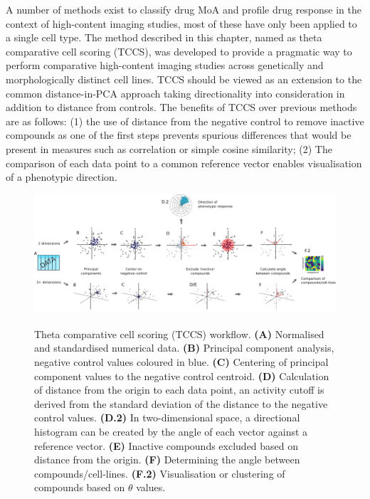 \documentclass[a4paper,11pt,twoside,openright]{scrbook}
\begin{document}
A number of methods exist to classify drug MoA and profile drug response in the context of high-content imaging 
studies, most of these have only been applied to a single cell type.
The method described in this chapter, named as theta comparative cell scoring (TCCS), was developed to provide a 
pragmatic way to perform comparative high-content imaging studies across genetically and morphologically distinct cell 
lines.
TCCS should be viewed as an extension to the common distance-in-PCA approach taking directionality into consideration 
in addition to distance from controls.
The benefits of TCCS over previous methods are as follows: (1) the use of distance from the negative control to remove 
inactive compounds as one of the first steps prevents spurious differences that would be present in measures such as 
correlation or simple cosine similarity; (2) The comparison of each data point to a common reference vector enables 
visualisation of a phenotypic direction.


\begin{figure}
    \captionsetup{width=0.8\textwidth}
    \caption[TCCS workflow]{
Theta comparative cell scoring (TCCS) workflow.
\textbf{(A)} Normalised and standardised numerical data.
    \textbf{(B)} Principal component analysis, negative control values coloured in blue.
    \textbf{(C)} Centering of principal component values to the negative control centroid.
    \textbf{(D)} Calculation of distance from the origin to each data point, an activity cutoff is derived from the 
standard deviation of the distance to the negative control values.
    \textbf{(D.2)} In two-dimensional space, a directional histogram can be created by the angle of each vector against 
a reference vector.
    \textbf{(E)} Inactive compounds excluded based on distance from the origin.
    \textbf{(F)} Determining the angle between compounds/cell-lines.
    \textbf{(F.2)} Visualisation or clustering of compounds based on $\theta$ values.
}
    \includegraphics[scale=1.0]{figs/ch3thetaWorkflow}
    \label{figure:theta_workflow}
\end{figure}
\end{document}
